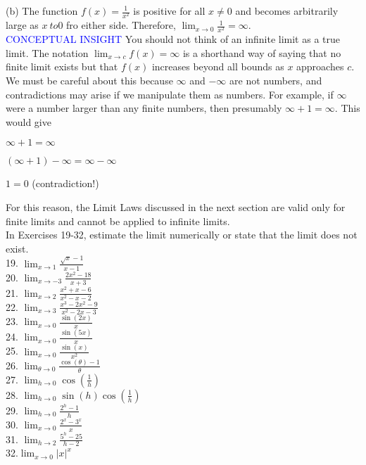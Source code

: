 \documentclass{article}
\begin{document}
(b) The function $f(x) = \frac{1}{x^2}$ is positive for all $x \neq 0$ and becomes arbitrarily large as $x\ to 0$ fro either side. Therefore, $\lim_{x \to 0}\frac{1}{x^2} = \infty$.\\

\textcolor{blue}{CONCEPTUAL INSIGHT} You should not think of an infinite limit as a true limit. The notation $\lim_{x\to c}f(x) = \infty$ is a shorthand way of saying that no finite limit exists but that $f(x)$ increases beyond all bounds as $x$ approaches $c$. We must be careful about this because $\infty$ and $-\infty$ are not numbers, and contradictions may arise if we manipulate them as numbers. For example, if $\infty$ were a number larger than any finite numbers, then presumably $\infty + 1 = \infty$. This would give
\begin{center}$\infty + 1 = \infty$\end{center}
\begin{center}$(\infty + 1) - \infty = \infty - \infty$\end{center}
\begin{center}$1 = 0$ (contradiction!)\end{center}
For this reason, the Limit Laws discussed in the next section are valid only for finite limits and cannot be applied to infinite limits.\\

In Exercises 19-32, estimate the limit numerically or state that the limit does not exist.\\
19. $\lim_{x \to 1}\frac{\sqrt{x} - 1}{x - 1}$\\
20. $\lim_{x \to -3}\frac{2x^2 - 18}{x + 3}$\\
21. $\lim_{x \to 2}\frac{x^2 + x - 6}{x^2 - x - 2}$\\
22. $\lim_{x \to 3}\frac{x^3 - 2x^2 - 9}{x^2 - 2x - 3}$\\ 
23. $\lim_{x \to 0}\frac{\sin(2x)}{x}$\\
24. $\lim_{x \to 0}\frac{\sin(5x)}{x}$\\
25. $\lim_{x \to 0}\frac{\sin(x)}{x^2}$\\
26. $\lim_{\theta \to 0}\frac{\cos(\theta) - 1}{\theta}$\\
27. $\lim_{h \to 0}\cos(\frac{1}{h})$\\
28. $\lim_{h \to 0}\sin(h)\cos(\frac{1}{h})$\\
29. $\lim_{h \to 0}\frac{2^h - 1}{h}$\\
30. $\lim_{x \to 0}\frac{2^x - 3^x}{x}$\\
31. $\lim_{h \to 2}\frac{5^h - 25}{h - 2}$\\
32.$\lim_{x \to 0}\left|x\right|^x$\\
\end{document}
